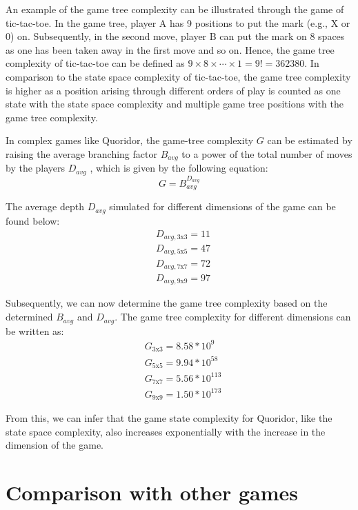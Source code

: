 An example of the game tree complexity can be illustrated through the game of tic-tac-toe. In the game tree, player A has 9 positions to put the mark (e.g., X or 0) on. Subsequently, in the second move, player B can put the mark on 8 spaces as one has been taken away in the first move and so on. Hence, the game tree complexity of tic-tac-toe can be defined as $9 \times 8 \times \cdots \times 1 = 9! = 362380$. In comparison to the state space complexity of tic-tac-toe, the game tree complexity is higher as a position arising through different orders of play is counted as one state with the state space complexity and multiple game tree positions with the game tree complexity. 


In complex games like Quoridor, the game-tree complexity $G$ can be estimated by raising the average branching factor $B_{avg}$ to a power of the total number of moves by the players $D_{avg}$ \citep{Mertens2006Quoridor}, which is given by the following equation: 
\begin{equation}
    G = B_{avg}^{D_{avg}}
\end{equation}

The average depth $D_{avg}$ simulated for different dimensions of the game can be found below:
\begin{align*}
    &D_{avg, \text{3x3}} = 11\\
    &D_{avg, \text{5x5}} = 47\\
    &D_{avg, \text{7x7}} = 72\\
    &D_{avg, \text{9x9}} = 97
\end{align*}

Subsequently, we can now determine the game tree complexity based on the determined $B_{avg}$ and $D_{avg}$. The game tree complexity for different dimensions can be written as:
\begin{align*}
    &G_\text{3x3} = 8.58 * 10^9\\
    &G_\text{5x5} = 9.94 * 10^{58}\\
    &G_\text{7x7} = 5.56 * 10^{113}\\
    &G_\text{9x9} = 1.50 * 10^{173}
\end{align*}

From this, we can infer that the game state complexity for Quoridor, like the state space complexity, also increases exponentially with the increase in the dimension of the game.


\section{Comparison with other games}

